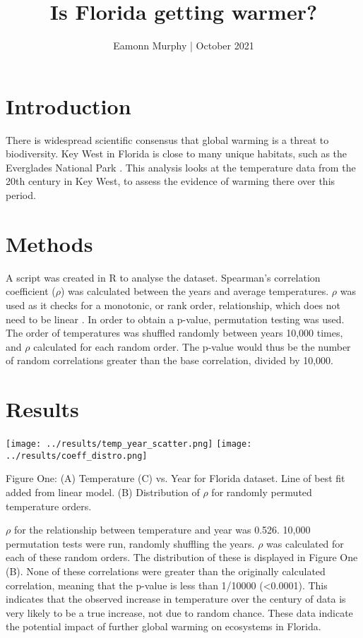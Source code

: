 \documentclass[10pt]{article}
\title{Is Florida getting warmer?}
\author{Eamonn Murphy | October 2021}
\date{}
\begin{document}
\maketitle

\thispagestyle{empty}

\section{Introduction}
There is widespread scientific consensus that global warming is a threat to biodiversity. Key West in Florida is close to many unique habitats, such as the Everglades National Park \cite{junk_brown_campbell_finlayson_gopal_ramberg_warner_2006}. This analysis looks at the temperature data from the 20th century in Key West, to assess the evidence of warming there over this period.

\section{Methods}
A script was created in R to analyse the dataset. Spearman's correlation 
coefficient ($\rho$) was calculated between the years and average temperatures. $\rho$ was used as it checks for a monotonic, or rank order, relationship, which does not need to be linear \cite{dewinter_gosling_potter_2016}. In  order to obtain a p-value, permutation testing was used. The order of temperatures was shuffled randomly between years 10,000  times, and $\rho$ calculated for each random order. The p-value would thus be the number of random correlations greater than the base correlation, divided by 10,000.

\section{Results}
\begin{center}
    \texttt{[image: ../results/temp\_year\_scatter.png]}
    \texttt{[image: ../results/coeff\_distro.png]}

    Figure One: (A) Temperature (C) vs. Year for Florida dataset. Line of best fit
    added from linear model. (B) Distribution of $\rho$
    for randomly permuted temperature orders.
\end{center}

$\rho$ for the relationship between temperature and year was 0.526.
10,000 permutation tests were run, randomly shuffling the years. $\rho$ was calculated for each of these random orders. The
distribution of these is displayed in Figure One (B). None of these correlations 
were greater than the originally calculated correlation, meaning that the p-value 
is less than 1/10000 (<0.0001). This indicates that the observed increase in 
temperature over the century of data is very likely to be a true increase, not 
due to random chance. These data indicate the potential impact of further global warming on ecosystems in Florida.



\end{document}
